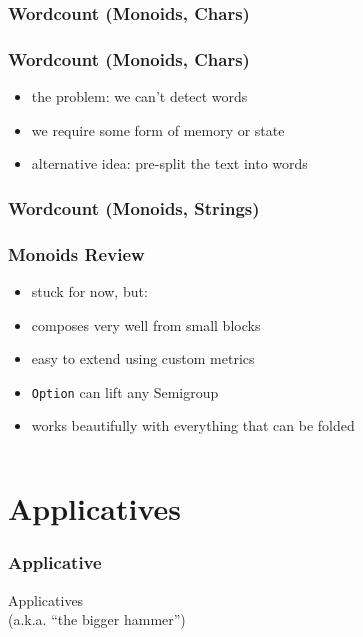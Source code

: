 \documentclass[aspectratio=169]{beamer}
\begin{document}
\begin{frame}[fragile]
  \frametitle{Wordcount (Monoids, Chars)}
\end{frame}

\begin{frame}
  \frametitle{Wordcount (Monoids, Chars)}
  \begin{itemize}
  \item the problem: we can't detect words
  \item we require some form of memory or state
  \item alternative idea: pre-split the text into words
  \end{itemize}
\end{frame}

\begin{frame}[fragile]
  \frametitle{Wordcount (Monoids, Strings)}
\end{frame}

\begin{frame}
  \frametitle{Monoids \textemdash{} Review}
  \begin{itemize}
  \item stuck for now, but:
  \item composes very well from small blocks
  \item easy to extend using custom metrics
  \item \texttt{Option} can lift any Semigroup
  \item works beautifully with everything that can be folded
  \end{itemize}
  \vspace{1cm}
  \inputminted[fontsize=\small]{scala}{snippets/foldable-def.scala}
\end{frame}

\section{Applicatives}\label{sec:applicatives}

\begin{frame}
  \frametitle{Applicative}
  \begin{center}
    { \huge Applicatives\\ }
    (a.k.a. ``the bigger hammer'')
  \end{center}
\end{frame}
\end{document}
